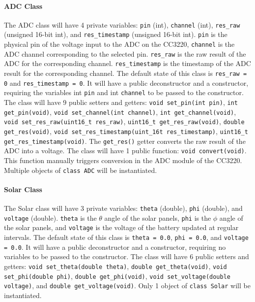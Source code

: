 \paragraph{ADC Class}
The ADC class will have 4 private variables: \texttt{pin} (int), 
\texttt{channel} (int), \texttt{res\_raw} (unsigned 16-bit int), and
\texttt{res\_timestamp} (unsigned 16-bit int). \texttt{pin} is the physical
pin of the voltage input to the ADC on the CC3220, \texttt{channel} is the
ADC channel corresponding to the selected pin. \texttt{res\_raw} is the raw
result of the ADC for the corresponding channel. \texttt{res\_timestamp} is the
timestamp of the ADC result for the corresponding channel. The default state
of this class is \texttt{res\_raw = 0} and \texttt{res\_timestamp = 0}. It will
have a public deconstructor and a constructor, requiring the variables int
\texttt{pin} and int \texttt{channel} to be passed to the constructor.
The class will have 9 public setters and getters:
\texttt{void set\_pin(int pin)}, \texttt{int get\_pin(void)},
\texttt{void set\_channel(int channel)}, \texttt{int get\_channel(void)},
\texttt{void set\_res\_raw(uint16\_t res\_raw)},
\texttt{uint16\_t get\_res\_raw(void)},
\texttt{double get\_res(void)},
\texttt{void set\_res\_timestamp(uint\_16t res\_timestamp)},
\texttt{uint16\_t get\_res\_timestamp(void)}. The \texttt{get\_res()} getter
converts the raw result of the ADC into a voltage. The class will have 1 public
function: \texttt{void convert(void)}. This function manually triggers
conversion in the ADC module of the CC3220. Multiple objects of
\texttt{class ADC} will be instantiated.

\paragraph{Solar Class}
The Solar class will have 3 private variables: \texttt{theta} (double), 
\texttt{phi} (double), and \texttt{voltage} (double). \texttt{theta} is the
$\theta$ angle of the solar panels, \texttt{phi} is the $\phi$ angle of the
solar panels, and \texttt{voltage} is the voltage of the battery updated at
regular intervals. The default state of this class is \texttt{theta = 0.0},
\texttt{phi = 0.0}, and \texttt{voltage = 0.0}. It will have a public
deconstructor and a constructor, requiring no variables to be passed to the
constructor. The class will have 6 public setters and getters:
\texttt{void set\_theta(double theta)}, \texttt{double get\_theta(void)},
\texttt{void set\_phi(double phi)}, \texttt{double get\_phi(void)},
\texttt{void set\_voltage(double voltage)}, and
\texttt{double get\_voltage(void)}. Only 
1 object of \texttt{class Solar} will be instantiated.

